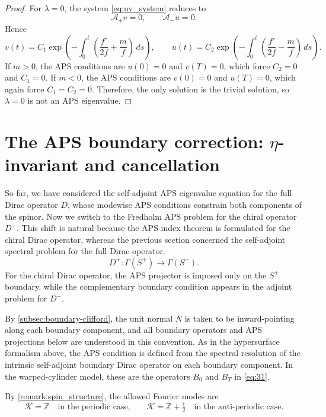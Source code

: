 \documentclass[11pt]{article}
\theoremstyle{definition}
\numberwithin{equation}{section}
\begin{document}
\begin{proof}
For $\lambda=0$, the system \eqref{eq:uv_system} reduces to
\begin{equation}
\mathcal A_+v=0,\qquad \mathcal A_-u=0.
\end{equation}
Hence
\begin{equation}
v(t)=C_1 \exp\!\left(-\int_0^t\left(\frac{f'}{2f}+\frac{m}{f}\right)\,ds\right),
\qquad
u(t)=C_2 \exp\!\left(-\int_0^t\left(\frac{f'}{2f}-\frac{m}{f}\right)\,ds\right).
\end{equation}
If $m>0$, the APS conditions are $u(0)=0$ and $v(T)=0$, which force
$C_2=0$ and $C_1=0$. If $m<0$, the APS conditions are $v(0)=0$ and $u(T)=0$,
which again force $C_1=C_2=0$. Therefore, the only solution is the trivial
solution, so $\lambda=0$ is not an APS eigenvalue.
\end{proof}


\section{The APS boundary correction: $\eta$-invariant and cancellation}
\label{sec:aps-boundary}
So far, we have considered the self-adjoint APS eigenvalue equation for the full Dirac operator $D$, whose modewise APS conditions constrain both components of the spinor.  Now we switch to the Fredholm APS problem for the chiral operator $D^+$. This shift is natural because the APS index theorem is formulated for the chiral Dirac operator, whereas the previous section concerned the self-adjoint spectral problem for the full Dirac operator.
\begin{equation}
D^{+}: \Gamma(S^{+}) \to \Gamma(S^{-}).
\end{equation}
For the chiral Dirac operator, the APS projector is imposed only on the $S^{+}$ boundary, while the complementary boundary condition appears in the adjoint problem for $D^{-}$. 

By \autoref{subsec:boundary-clifford}, the unit normal \(N\) is taken to be inward-pointing along each boundary component, and all boundary operators and APS projections below are understood in this convention. As in the hypersurface formalism above, the APS condition is defined from the spectral resolution of the intrinsic self-adjoint boundary Dirac operator on each boundary component. In the warped-cylinder model, these are the operators \(B_0\) and \(B_T\) in \eqref{eq:31}.

By \autoref{remark:spin_structure}, the allowed Fourier modes are
\begin{equation}
\mathcal K=\mathbb Z
\quad\text{in the periodic case,}\qquad
\mathcal K=\mathbb Z+\tfrac12
\quad\text{in the anti-periodic case.}
\end{equation}
\end{document}
